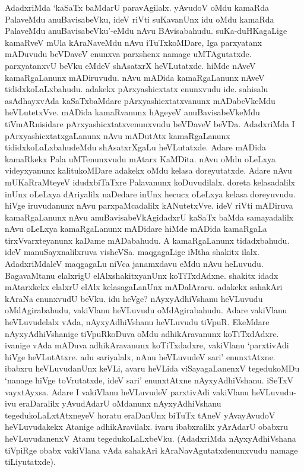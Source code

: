 AdadxriMda `kaSaTx baMdarU paravAgilalx. yAvudoV oMdu kamaRda PalaveMdu anuBavisabeVku, ideV riVti suKavanUnx idu oMdu kamaRda PalaveMdu anuBavisabeVku'-eMdu nAvu BAvisabahudu. suKa-duHKagaLige kamaRveV mUla kAraNaveMdu nAvu iTuTxkoMDare, Iga parxyatanx mADuvudu beVDaveV enunxva parxshenx namage uMTAgutatxde. parxyatanxvU beVku eMdeV shAsatxrX heVLutatxde. hiMde nAveV kamaRgaLanunx mADiruvudu. nAvu mADida kamaRgaLanunx nAveV tididxkoLaLxbahudu. adakekx pArxyashicxtatx enunxvudu ide. sahisalu asAdhayxvAda kaSaTxbaMdare pArxyashicxtatxvanunx mADabeVkeMdu heVLutetxVve. mADida kamaRvanunx hAgeyeV anuBavisabeVkeMdu tiVmARnisidare pArxyashicxtatxvenunxvudu beVDaveV beVDa. AdadxriMda I pArxyashicxtatxgaLanunx nAvu mADutAtx kamaRgaLanunx tididxkoLaLxbahudeMdu shAsatxrXgaLu heVLutatxde. Adare mADida kamaRkekx Pala uMTenunxvudu mAtarx KaMDita. nAvu oMdu oLeLxya videyxyanunx kalitukoMDare adakekx oMdu kelasa doreyutatxde. Adare nAvu mUKaRraMteyeV idudxbiTaTxre Palavanunx koDuvudilalx. doreta kelasadalilx inUnx oLeLxya dAriyalilx naDedare inUnx hecucx oLeLxya kelasa doreyuvudu. hiVge iruvudanunx nAvu parxpaMcadalilx kANutetxVve. ideV riVti mADiruva kamaRgaLanunx nAvu anuBavisabeVkAgidadxrU kaSaTx baMda samayadalilx nAvu oLeLxya kamaRgaLanunx mADidare hiMde mADida kamaRgaLa tirxVvarxteyanunx kaDame mADabahudu. A kamaRgaLanunx tidadxbahudu. ideV manuSayxnalilxruva visheVSa. maqgagaLige iMtha shakitx ilalx. AdadxriMdaleV maqgagaLu niVca janamxdavu eMdu nAvu heLuvudu. BagavaMtanu elalxrigU elAlxshakitxyanUnx koTiTxdAdxne. shakitx idadx mAtarxkekx elalxrU elAlx kelasagaLanUnx mADalAraru. adakekx sahakAri kAraNa enunxvudU beVku. idu heVge? nAyxyAdhiVshanu heVLuvudu oMdAgirabahudu, vakiVlanu heVLuvudu oMdAgirabahudu. Adare vakiVlanu heVLuvudelalx vAda, nAyxyAdhiVshanu heVLuvudu tiVpuR. EkeMdare nAyxyAdhiVshanige tiVpuRkoDuva oMdu adhikAravanunx koTiTxdAdxre. ivanige vAda mADuva adhikAravanunx koTiTxdadxre, vakiVlanu `parxtivAdi hiVge heVLutAtxre. adu sariyalalx, nAnu heVLuvudeV sari' enunxtAtxne. ibabxru heVLuvudanUnx keVLi, avaru heVLida viSayagaLanenxV tegedukoMDu `nanage hiVge toVrutatxde, ideV sari' enunxtAtxne nAyxyAdhiVshanu. iSeTxV vayxtAyxsa. Adare I vakiVlanu heVLuvudeV parxtivAdi vakiVlanu heVLuvudu-ivu eraDaralilx yAvudAdarU oMdanunx nAyxyAdhiVshanu tegedukoLaLxtAtxneyeV horatu eraDanUnx biTuTx tAneV yAvayAvudoV heVLuvudakekx Atanige adhikAravilalx. ivaru ibabxralilx yArAdarU obabxru heVLuvudanenxV Atanu tegedukoLaLxbeVku. (AdadxriMda nAyxyAdhiVshana tiVpiRge obabx vakiVlana vAda sahakAri kAraNavAgutatxdenunxvudu namage tiLiyutatxde). 

